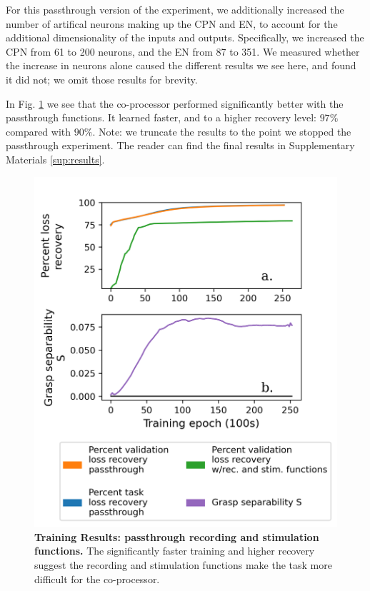 \documentclass[12pt]{iopart}
\begin{document}
For this passthrough version of the experiment, we additionally increased the number of artifical neurons
making up the CPN and EN, to account for the additional dimensionality of the inputs and outputs. Specifically,
we increased the CPN from 61 to 200 neurons, and the EN from 87 to 351. We measured whether the increase in
neurons alone caused the different results we see here, and found it did not; we omit those results for
brevity.

In Fig. \ref{fig:results_passthrough} we see that the co-processor performed significantly better with
the passthrough functions. It learned faster, and to a higher recovery level: $97\%$ compared with $90\%$.
Note: we truncate the results to the point we stopped the passthrough experiment. The reader can find the
final results in Supplementary Materials \ref{sup:results}.

\begin{figure}[h!]
\centering
\includegraphics[scale=0.7]{training_results_passthrough.png}
\caption{\textbf{Training Results: passthrough recording and stimulation functions.} The significantly faster
         training and higher recovery suggest the recording and stimulation functions make the task
         more difficult for the co-processor.}
\label{fig:results_passthrough}
\end{figure}
\end{document}
